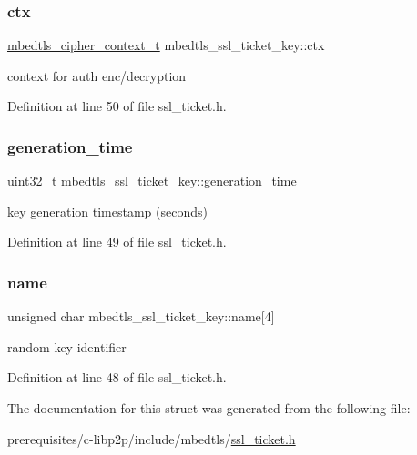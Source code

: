 \subsubsection{\texorpdfstring{ctx}{ctx}}
{\footnotesize\ttfamily \mbox{\hyperlink{structmbedtls__cipher__context__t}{mbedtls\+\_\+cipher\+\_\+context\+\_\+t}} mbedtls\+\_\+ssl\+\_\+ticket\+\_\+key\+::ctx}

context for auth enc/decryption 

Definition at line 50 of file ssl\+\_\+ticket.\+h.

\mbox{\label{structmbedtls__ssl__ticket__key_ada9d97d06d4c215e4810880427ca50ad}} 
\subsubsection{\texorpdfstring{generation\+\_\+time}{generation\_time}}
{\footnotesize\ttfamily uint32\+\_\+t mbedtls\+\_\+ssl\+\_\+ticket\+\_\+key\+::generation\+\_\+time}

key generation timestamp (seconds) 

Definition at line 49 of file ssl\+\_\+ticket.\+h.

\mbox{\label{structmbedtls__ssl__ticket__key_a5c80ec11a07ab4e19e775f7586a11d21}} 
\subsubsection{\texorpdfstring{name}{name}}
{\footnotesize\ttfamily unsigned char mbedtls\+\_\+ssl\+\_\+ticket\+\_\+key\+::name\mbox{[}4\mbox{]}}

random key identifier 

Definition at line 48 of file ssl\+\_\+ticket.\+h.



The documentation for this struct was generated from the following file\+:\begin{DoxyCompactItemize}
\item 
prerequisites/c-\/libp2p/include/mbedtls/\mbox{\hyperlink{ssl__ticket_8h}{ssl\+\_\+ticket.\+h}}\end{DoxyCompactItemize}
